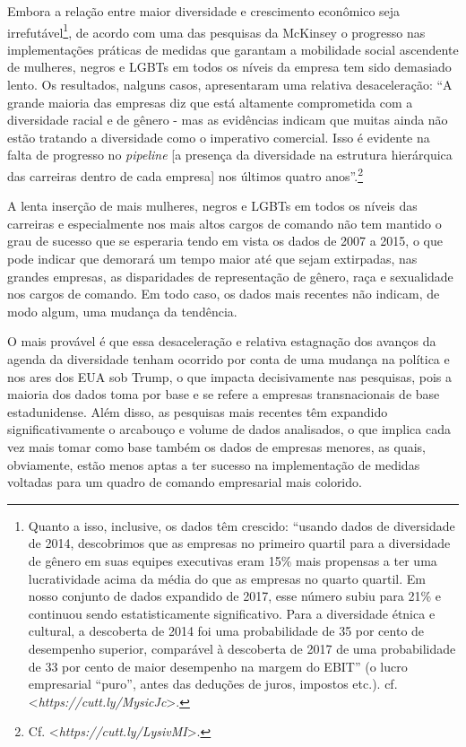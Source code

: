 Embora a relação entre maior diversidade e crescimento econômico seja
irrefutável\footnote{Quanto a isso, inclusive, os dados têm crescido:
  ``usando dados de diversidade de 2014, descobrimos que as empresas no
  primeiro quartil para a diversidade de gênero em suas equipes
  executivas eram 15\% mais propensas a ter uma lucratividade acima da
  média do que as empresas no quarto quartil. Em nosso conjunto de dados
  expandido de 2017, esse número subiu para 21\% e continuou sendo
  estatisticamente significativo. Para a diversidade étnica e cultural,
  a descoberta de 2014 foi uma probabilidade de 35 por cento de
  desempenho superior, comparável à descoberta de 2017 de uma
  probabilidade de 33 por cento de maior desempenho na margem do EBIT''
  (o lucro empresarial ``puro'', antes das deduções de juros, impostos
  etc.). cf.
  \textless{}\emph{https://cutt.ly/MysicJc}\textgreater{}.},
de acordo com uma das pesquisas da McKinsey o progresso nas
implementações práticas de medidas que garantam a mobilidade social
ascendente de mulheres, negros e LGBTs em todos os níveis da empresa tem
sido demasiado lento. Os resultados, nalguns casos, apresentaram uma
relativa desaceleração: ``A grande maioria das empresas diz que está
altamente comprometida com a diversidade racial e de gênero - mas as
evidências indicam que muitas ainda não estão tratando a diversidade
como o imperativo comercial. Isso é evidente na falta de progresso no
\emph{pipeline} {[}a presença da diversidade na estrutura hierárquica
das carreiras dentro de cada empresa{]} nos últimos quatro
anos''.\footnote{Cf. \textless{}\emph{https://cutt.ly/LysivMI}\textgreater{}.}

A lenta inserção de mais mulheres, negros e LGBTs em todos os níveis das
carreiras e especialmente nos mais altos cargos de comando não tem
mantido o grau de sucesso que se esperaria tendo em vista os dados de
2007 a 2015, o que pode indicar que demorará um tempo maior até que
sejam extirpadas, nas grandes empresas, as disparidades de representação
de gênero, raça e sexualidade nos cargos de comando. Em todo caso, os
dados mais recentes não indicam, de modo algum, uma mudança da
tendência.

O mais provável é que essa desaceleração e relativa estagnação dos
avanços da agenda da diversidade tenham ocorrido por conta de uma
mudança na política e nos ares dos EUA sob Trump, o que impacta
decisivamente nas pesquisas, pois a maioria dos dados toma por base e se
refere a empresas transnacionais de base estadunidense. Além disso, as
pesquisas mais recentes têm expandido significativamente o arcabouço e
volume de dados analisados, o que implica cada vez mais tomar como base
também os dados de empresas menores, as quais, obviamente, estão menos
aptas a ter sucesso na implementação de medidas voltadas para um quadro
de comando empresarial mais colorido.

